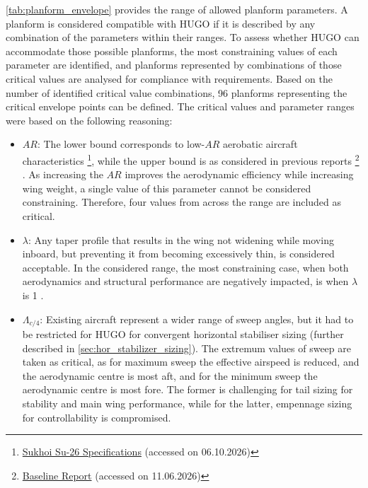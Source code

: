 \autoref{tab:planform_envelope} provides the range of allowed planform parameters. A planform is considered compatible with HUGO if it is described by any combination of the parameters within their ranges. To assess whether HUGO can accommodate those possible planforms, the most constraining values of each parameter are identified, and planforms represented by combinations of those critical values are analysed for compliance with requirements. Based on the number of identified critical value combinations, 96 planforms representing the critical envelope points can be defined. The critical values and parameter ranges were based on the following reasoning:
\begin{itemize}
    \item $AR$: The lower bound corresponds to low-$AR$ aerobatic aircraft characteristics \footnote{\label{foot:Aerobatic_AR}\href{https://web.archive.org/web/20060414172013/http://www.sukhoi.org/eng/planes/civil/su-26/characteristic/}{Sukhoi Su-26 Specifications} (accessed on 06.10.2026)}, while the upper bound is as considered in previous reports \footnote{\label{foot:baseline}\href{https://github.com/Teo-Cokonaj/DSE-28/blob/main/docs/Projects/DSE_Group_28_Baseline_Report.pdf}{Baseline Report} (accessed on 11.06.2026)} . As increasing the $AR$ improves the aerodynamic efficiency while increasing wing weight, a single value of this parameter cannot be considered constraining. Therefore, four values from across the range are included as critical.
    \item $\lambda$: Any taper profile that results in the wing not widening while moving inboard, but preventing it from becoming excessively thin, is considered acceptable. In the considered range, the most constraining case, when both aerodynamics and structural performance are negatively impacted, is when $\lambda$ is 1 \cite[p.401-405, p.438]{raymer1992aircraft, AndersonAerodynamics}.
    \item $\Lambda_{c/4}$: Existing aircraft represent a wider range of sweep angles, but it had to be restricted for HUGO for convergent horizontal stabiliser sizing (further described in \autoref{sec:hor_stabilizer_sizing}). The extremum values of sweep are taken as critical, as for maximum sweep the effective airspeed is reduced, and the aerodynamic centre is most aft, and for the minimum sweep the aerodynamic centre is most fore. The former is challenging for tail sizing for stability and main wing performance, while for the latter, empennage sizing for controllability is compromised. 

\end{itemize}
